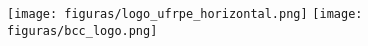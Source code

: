 \documentclass[
	openany,
	12pt,				%
    oneside,
	a4paper,			%
	english,
	brazil				%
	]{abntex2}
\begin{document}

\frenchspacing 



	\begin{figure}[ht]
		\texttt{[image: figuras/logo\_ufrpe\_horizontal.png]}
		\hspace{5.5cm}
    	\texttt{[image: figuras/bcc\_logo.png]}
	\end{figure}    

\imprimircapa
\imprimirfolhaderosto

%



%




\listoffigures
\cleardoublepage

\listoftables*
\cleardoublepage
\end{document}
